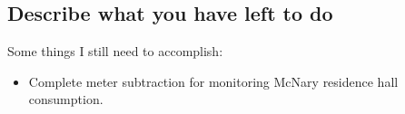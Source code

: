 \documentclass[letterpaper,10pt,serif,draftclsnofoot,onecolumn,compsoc,titlepage]{IEEEtran}
\begin{document}
\subsection{Describe what you have left to do}
Some things I still need to accomplish:
\begin{itemize}
  \item Complete meter subtraction for monitoring McNary residence hall consumption.
\end{itemize}
\newpage
\cite{mongoose}


\end{document}
